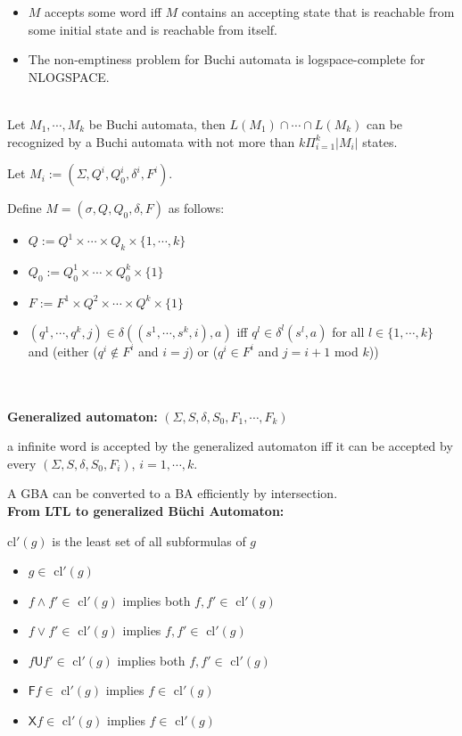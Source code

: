 \documentclass[12pt]{article}
\begin{document}
\begin{CJK*}{GBK}{song}
\begin{itemize}
\item $M$ accepts some word iff $M$ contains an accepting state that is reachable from some initial state and is reachable from itself.

\item The non-emptiness problem for Buchi automata is logspace-complete for NLOGSPACE.

\end{itemize}



\\

Let $M_1,\cdots, M_k$ be Buchi automata, then $L(M_1)\cap\cdots\cap L(M_k)$ can be recognized by a Buchi automata with not more than $k\Pi^k_{i=1}|M_i|$ states.

Let
$M_i:=(\Sigma, Q^i, Q^i_0,\delta^i, F^i)$.

Define $M=(\sigma, Q, Q_0, \delta, F)$ as follows:

\begin{itemize}
\item $Q:=Q^1\times\cdots\times Q_k\times\{1,\cdots,k\}$
\item $Q_0:=Q_0^1\times\cdots\times Q_0^k\times\{1\}$
\item $F:=F^1\times Q^2\times\cdots\times Q^k\times\{1\}$
\item $(q^1,\cdots, q^k, j)\in \delta ((s^1,\cdots, s^k,i),a)$ iff $q^l\in \delta^l(s^l,a)$ for all $l\in\{1,\cdots,k\}$ and
(either ($q^i\not\in F^i$ and $i=j$) or ($q^i\in F^i$ and $j=i+1$ mod $k$))
\end{itemize}


\\

\\

{\bf Generalized automaton:} $(\Sigma, S, \delta, S_0, F_1, \cdots, F_k)$

a infinite word is accepted by the generalized automaton iff it can be accepted by every $(\Sigma, S, \delta, S_0, F_i)$, $i=1,\cdots, k$.

A GBA can be converted to a BA efficiently by intersection.
\\


{\bf From LTL to generalized B\"{u}chi Automaton:}

cl$'(g)$ is the least set of all subformulas of $g$
\begin{itemize}
\item $g\in$ cl$'(g)$
\item $f\wedge f'\in $ cl$'(g)$ implies both $f,f'\in$ cl$'(g)$
\item $f\vee f'\in $ cl$'(g)$ implies $f,f'\in$ cl$'(g)$
\item $f\textsf{U} f'\in $ cl$'(g)$ implies both $f,f'\in$ cl$'(g)$
\item $\textsf{F}f\in$ cl$'(g)$ implies $f\in$ cl$'(g)$
\item $\textsf{X}f\in$ cl$'(g)$ implies $f\in$ cl$'(g)$
\end{itemize}


\end{CJK*}
\end{document}
